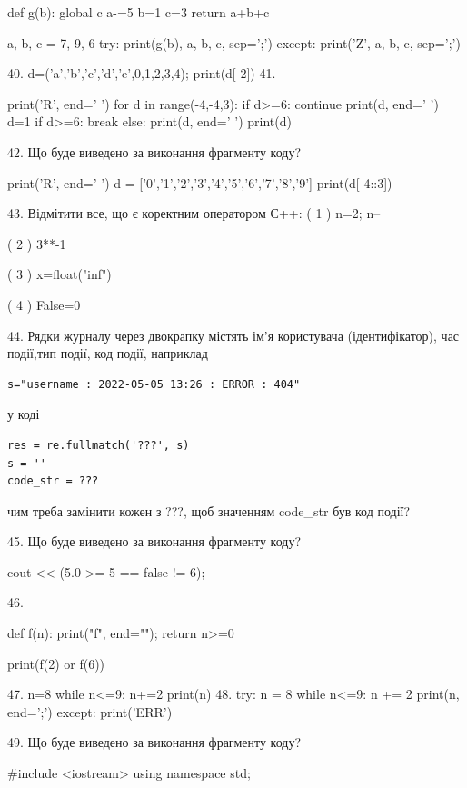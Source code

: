 \documentclass[11pt]{article}
\begin{document}
def g(b):
global c    a-=5
    b=1
    c=3
    return a+b+c

a, b, c = 7, 9, 6
try:
    print(g(b), a, b, c, sep=';')
except:
    print('Z', a, b, c, sep=';')

40. 
d=('a','b','c','d','e',0,1,2,3,4); print(d[-2])
41. 

print('R', end=' ')
for d in range(-4,-4,3):
    if d>=6:
        continue
        print(d, end=' ')
        d=1
    if d>=6:
        break
    else:
        print(d, end=' ')
    print(d)

42. Що буде виведено за виконання фрагменту коду?

print('R', end=' ')
d = ['0','1','2','3','4','5','6','7','8','9']
print(d[-4::3])


43. %
Відмітити все, що є коректним оператором С++:
( 1 ) n=2; n--

( 2 ) 3**-1

( 3 ) x=float("inf")

( 4 ) False=0

44. 
Рядки журналу через двокрапку містять ім'я користувача (ідентифікатор), час події,тип події, код події, наприклад
\begin{verbatim}
s="username : 2022-05-05 13:26 : ERROR : 404"
\end{verbatim}
у коді 
\begin{verbatim}
res = re.fullmatch('???', s) 
s = ''
code_str = ??? 
\end{verbatim}
чим треба замінити кожен з ???, щоб значенням code\_str був код події? 



45. Що буде виведено за виконання фрагменту коду?

cout << (5.0 >= 5 == false != 6);

46. 

def f(n):
    print("f", end="");
    return n>=0

print(f(2) or f(6))

47. 
n=8
   while n<=9: n+=2
   print(n)
48. 
try:
    n = 8
    while n<=9:
        n += 2
    print(n, end=';')
except:
    print('ERR')

49. Що буде виведено за виконання фрагменту коду?

#include <iostream>
using namespace std;
\end{document}
